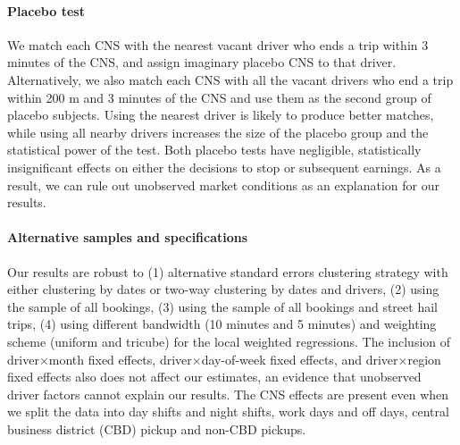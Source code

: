 \documentclass[reviewmode,AEJ]{AEA}
\begin{document}
\paragraph{Placebo test}
We match each CNS with the nearest vacant driver who ends a trip within 3 minutes of the CNS, and assign imaginary placebo CNS to that driver. Alternatively, we also match each CNS with all the vacant drivers who end a trip within 200 m and 3 minutes of the CNS and use them as the second group of placebo subjects. Using the nearest driver is likely to produce better matches, while using all nearby drivers increases the size of the placebo group and the statistical power of the test. 
Both placebo tests %
have negligible, statistically insignificant effects on either the decisions to stop or subsequent earnings. As a result, we can rule out unobserved market conditions as an explanation for our results.



\paragraph{Alternative samples and specifications} Our results are robust to (1) alternative standard errors clustering strategy with either clustering by dates or two-way clustering by dates and drivers, (2) using the sample of all bookings, (3) using the sample of all bookings and street hail trips, (4) using different bandwidth (10 minutes and 5 minutes) and weighting scheme (uniform and tricube) for the local weighted regressions. The inclusion of driver\(\times\)month fixed effects, driver\(\times\)day-of-week fixed effects, and driver\(\times\)region fixed effects also does not affect our estimates, an evidence that unobserved driver factors cannot explain our results. The CNS effects are present even when we split the data into day shifts and night shifts, work days and off days, central business district (CBD) pickup and non-CBD pickups.  
\end{document}
